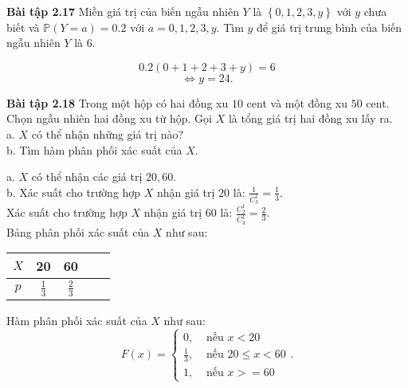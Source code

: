\documentclass[12pt,a4paper]{article}
\begin{document}
\begin{mybox}
    \textbf{Bài tập 2.17} Miền giá trị của biến ngẫu nhiên $Y$ là $\left\{ {0, 1, 2, 3, y} \right\}$ với $y$ chưa biết và $\mathbb{P} \left( {Y = a}\right) = 0.2$
    với $a = 0, 1, 2, 3 , y.$ Tìm $y$ để giá trị trung bình của biến ngẫu nhiên $Y$ là $6.$
\end{mybox}
$$0.2 \left( {0 + 1 + 2 + 3 + y}\right) = 6$$
$$\Leftrightarrow y = 24.$$

\begin{mybox}
    \textbf{Bài tập 2.18} Trong một hộp có hai đồng xu $10$ cent và một đồng xu $50$ cent. Chọn ngẫu nhiên hai đồng xu từ hộp.
    Gọi $X$ là tổng giá trị hai đồng xu lấy ra.\\
    a. $X$ có thể nhận những giá trị nào?\\
    b. Tìm hàm phân phối xác suất của $X.$
\end{mybox}
a. $X$ có thể nhận các giá trị $20, 60.$\\
b. Xác suất cho trường hợp $X$ nhận giá trị $20$ là: $\frac{1}{C_3^1} = \frac{1}{3}.$\\
Xác suất cho trường hợp $X$ nhận giá trị $60$ là: $\frac{C_2^1 }{C_3^1} = \frac{2}{3}.$\\
Bảng phân phối xác suất của $X$ như sau:
\begin{table}[H]
    \begin{center}
        \begin{tabular}{|c|c|c|c|c|}
            \hline 
            $X$ & 20 & 60  \\ 
            \hline 
            $p$ & $\frac{1}{3}$ & $\frac{2}{3}$   \\ 
            \hline 
            \end{tabular} 
    \end{center}
\end{table}
Hàm phân phối xác suất của $X$ như sau:
$$F \left( x \right) = 
\begin{cases}
    0, &\text{ nếu } x < 20\\
    \frac{1}{3}, &\text{ nếu } 20 \leqslant x < 60\\
    1, &\text{ nếu } x >= 60
\end{cases}
.$$
\end{document}
